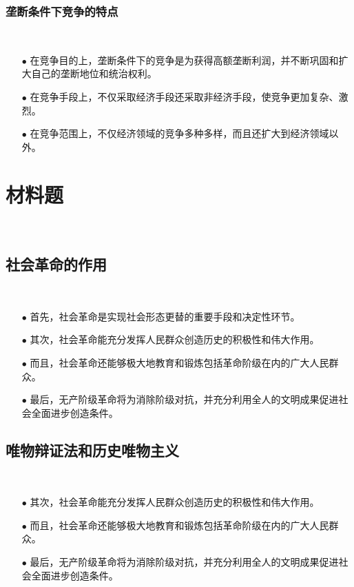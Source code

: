 \documentclass{ctexart}
\begin{document}
\subsubsection{垄断条件下竞争的特点}~{}
\vspace{-5mm}
\begin{itemize}
\item[$\bullet$]在竞争目的上，垄断条件下的竞争是为获得高额垄断利润，并不断巩固和扩大自己的垄断地位和统治权利。
\item[$\bullet$]在竞争手段上，不仅采取经济手段还采取非经济手段，使竞争更加复杂、激烈。
\item[$\bullet$]在竞争范围上，不仅经济领域的竞争多种多样，而且还扩大到经济领域以外。
\end{itemize}

\newpage
\section{材料题}~{}
\subsection{社会革命的作用}~{}
\vspace{-5mm}
\begin{itemize}
\item[$\bullet$]首先，社会革命是实现社会形态更替的重要手段和决定性环节。
\item[$\bullet$]其次，社会革命能充分发挥人民群众创造历史的积极性和伟大作用。
\item[$\bullet$]而且，社会革命还能够极大地教育和锻炼包括革命阶级在内的广大人民群众。
\item[$\bullet$]最后，无产阶级革命将为消除阶级对抗，并充分利用全人的文明成果促进社会全面进步创造条件。 
\end{itemize}

\subsection{唯物辩证法和历史唯物主义}~{}
\vspace{-5mm}
\begin{itemize}
\item[$\bullet$]其次，社会革命能充分发挥人民群众创造历史的积极性和伟大作用。
\item[$\bullet$]而且，社会革命还能够极大地教育和锻炼包括革命阶级在内的广大人民群众。
\item[$\bullet$]最后，无产阶级革命将为消除阶级对抗，并充分利用全人的文明成果促进社会全面进步创造条件。 
\end{itemize}
\end{document}
